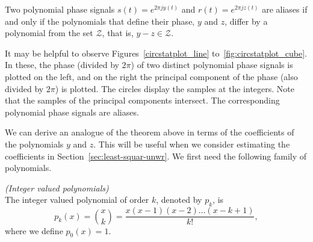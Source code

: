 \documentclass[journal]{IEEEtran}
\begin{document}
\begin{theorem}\label{thm:circpolysampledthm}
Two polynomial phase signals $s(t) = e^{2\pi j y(t)}$  and $r(t) = e^{2\pi j z(t)}$  are aliases if and only if the polynomials that define their phase, $y$ and $z$, differ by a polynomial from the set $\mathcal{Z}$, that is, $y - z \in \mathcal{Z}$.
\end{theorem}



It may be helpful to observe Figures~\ref{circstatplot_line} to~\ref{fig:circstatplot_cube}.  In these, the phase (divided by $2\pi$) of two distinct polynomial phase signals is plotted on the left, and on the right the principal component of the phase (also divided by $2\pi$) is plotted. The circles display the samples at the integers. Note that the samples of the principal components intersect.  The corresponding polynomial phase signals are aliases.

We can derive an analogue of the theorem above in terms of the coefficients of the polynomials $y$ and $z$. This will be useful when we consider estimating the coefficients in Section~\ref{sec:least-squar-unwr}.  We first need the following family of polynomials. 

\begin{definition} \emph{(Integer valued polynomials)} \label{def:intvaledpolys}
\\The integer valued polynomial of order $k$, denoted by $p_k$, is
\[
p_k(x) = \binom{x}{k} = \frac{x(x-1)(x-2)\dots(x-k+1)}{k!},
\]
where we define $p_0(x) = 1$.
\end{definition}
\end{document}
